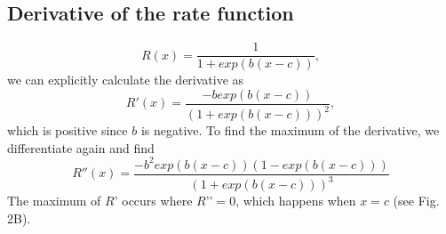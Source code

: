 \documentclass[12 pt]{article}
\begin{document}
\subsection*{Derivative of the rate function}
\begin{equation}
    R(x)=\frac{1}{1+exp(b(x-c))}, \tag{Eq. \theequation}
\end{equation}
we can explicitly calculate the derivative as
\begin{equation}
    R'(x)=\frac{-b exp(b(x-c))}{(1+exp(b(x-c)))^2}, \tag{Eq. \theequation}
\end{equation}
which is positive since $b$ is negative. To find the maximum of the derivative, we differentiate again and find
\begin{equation}
    R''(x) = \frac{-b^2 exp(b(x-c))(1-exp(b(x-c)))}{(1+exp(b(x-c)))^3} \tag{Eq. \theequation}
\end{equation}
The maximum of $R’$ occurs where $R’’ = 0$, which happens when $x = c$ (see Fig. 2B).
\end{document}
